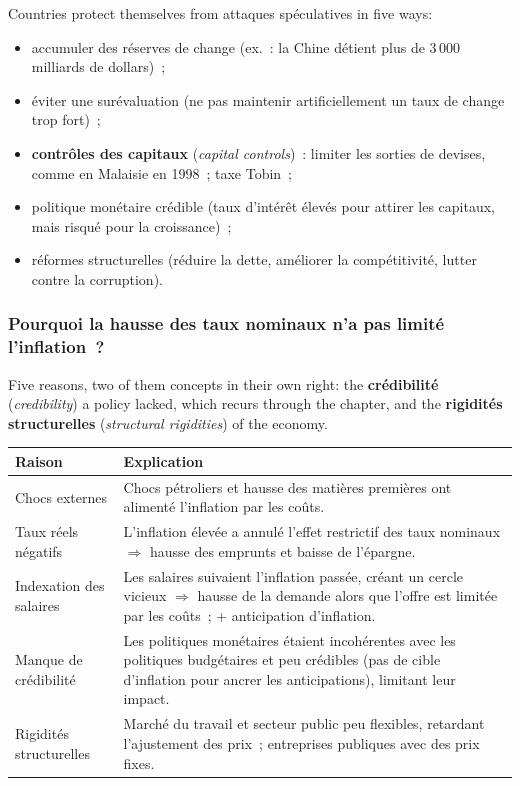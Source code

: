 Countries protect themselves from attaques spéculatives in five ways:
\begin{itemize}
  \item accumuler des réserves de change (ex.~: la Chine détient plus de 3\,000
    milliards de dollars)~;
  \item éviter une surévaluation (ne pas maintenir artificiellement un taux de change
    trop fort)~;
  \item \textbf{contrôles des capitaux} (\textit{capital controls})~: limiter les
    sorties de devises, comme en Malaisie en 1998~; taxe Tobin~;
  \item politique monétaire crédible (taux d'intérêt élevés pour attirer les capitaux,
    mais risqué pour la croissance)~;
  \item réformes structurelles (réduire la dette, améliorer la compétitivité, lutter
    contre la corruption).
\end{itemize}

\subsubsection{Pourquoi la hausse des taux nominaux n'a pas limité l'inflation~?}

Five reasons, two of them concepts in their own right: the \textbf{crédibilité}
(\textit{credibility}) a policy lacked, which recurs through the chapter, and the
\textbf{rigidités structurelles} (\textit{structural rigidities}) of the economy.

\begin{center}
  \small
  \begin{tabularx}{\textwidth}{>{\raggedright\arraybackslash}p{3.6cm}
      >{\raggedright\arraybackslash}X}
    \toprule
    Raison & Explication \\
    \midrule
    Chocs externes & Chocs pétroliers et hausse des matières premières ont alimenté
      l'inflation par les coûts. \\
    \addlinespace
    Taux réels négatifs & L'inflation élevée a annulé l'effet restrictif des taux
      nominaux $\Rightarrow$ hausse des emprunts et baisse de l'épargne. \\
    \addlinespace
    Indexation des salaires & Les salaires suivaient l'inflation passée, créant un
      cercle vicieux $\Rightarrow$ hausse de la demande alors que l'offre est limitée
      par les coûts~; + anticipation d'inflation. \\
    \addlinespace
    Manque de crédibilité & Les politiques monétaires étaient incohérentes avec les
      politiques budgétaires et peu crédibles (pas de cible d'inflation pour ancrer les
      anticipations), limitant leur impact. \\
    \addlinespace
    Rigidités structurelles & Marché du travail et secteur public peu flexibles,
      retardant l'ajustement des prix~; entreprises publiques avec des prix fixes. \\
    \bottomrule
  \end{tabularx}
\end{center}

